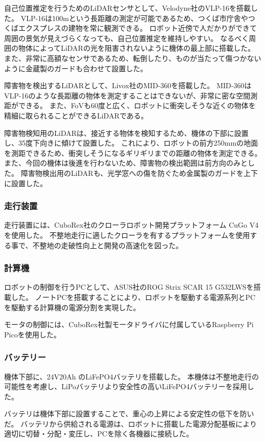 自己位置推定を行うためのLiDARセンサとして、Velodyne社のVLP-16\cite{VLP16}を搭載した。
VLP-16は100mという長距離の測定が可能であるため、つくば市庁舎やつくばエクスプレスの建物を常に観測できる。
ロボット近傍で人だかりができて周囲の景気が見えづらくなっても、自己位置推定を維持しやすい。
なるべく周囲の物体によってLiDARの光を阻害されないように機体の最上部に搭載した。
また、非常に高額なセンサであるため、転倒したり、ものが当たって傷つかないように金蔵製のガードも合わせて設置した。

障害物を検出するLiDARとして、Livox社のMID-360\cite{MID360}を搭載した。
MID-360はVLP-16のような長距離の物体を測定することはできないが、非常に密な空間測距ができる。
また、FoVも60度と広く、ロボットに衝突しそうな近くの物体を精細に取られることができるLiDARである。

障害物検知用のLiDARは、接近する物体を検知するため、機体の下部に設置し、35度下向きに傾けて設置した。
これにより、ロボットの前方250mmの地面を測距できるため、衝突しそうになるギリギリまでの距離の物体を測定できる。
また、今回の機体は後進を行わないため、障害物の検出範囲は前方向のみとした。
障害物検出用のLiDARも、光学窓への傷を防ぐため金属製のガードを上下に設置した。

\subsubsection{走行装置}
走行装置には、CuboRex社のクローラロボット開発プラットフォーム CuGo V4\cite{CuGo}を使用した。
不整地走行に適したクローラを有するプラットフォームを使用する事で、不整地の走破性向上と開発の高速化を図った。

\subsubsection{計算機}
ロボットの制御を行うPCとして、ASUS社のROG Strix SCAR 15 G532LWS\cite{PC}を搭載した。
ノートPCを搭載することにより、ロボットを駆動する電源系列とPCを駆動する計算機の電源分割を実現した。

モータの制御には、CuboRex社製モータドライバに付属しているRaspberry Pi Pico\cite{PICO}を使用した。

\subsubsection{バッテリー}
機体下部に、24V20Ah のLiFePO4バッテリを搭載した。
本機体は不整地走行の可能性を考慮し、LiPoバッテリより安全性の高いLiFePO4バッテリーを採用した。

バッテリは機体下部に設置することで、重心の上昇による安定性の低下を防いだ。
バッテリから供給される電源は、ロボットに搭載した電源分配基板により適切に切替・分配・変圧し、PCを除く各機器に接続した。

